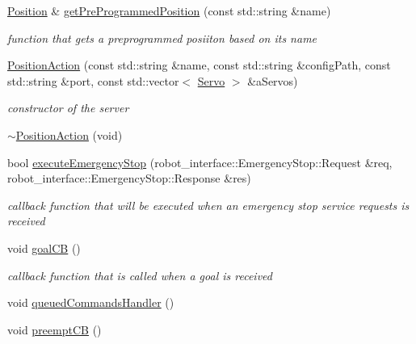 \begin{DoxyCompactItemize}
\item 
\hyperlink{structRobotInterface_1_1HighLevel_1_1Position}{Position} \& \hyperlink{classRobotInterface_1_1HighLevel_1_1PositionAction_a8a7971e098ed10e5ab8122ace60e2ae9}{get\+Pre\+Programmed\+Position} (const std\+::string \&name)
\begin{DoxyCompactList}\small\item\em function that gets a preprogrammed posiiton based on its name \end{DoxyCompactList}\item 
\hyperlink{classRobotInterface_1_1HighLevel_1_1PositionAction_a60ee7d48747b2b7e2e0c25129d2d3172}{Position\+Action} (const std\+::string \&name, const std\+::string \&config\+Path, const std\+::string \&port, const std\+::vector$<$ \hyperlink{classRobotInterface_1_1HighLevel_1_1Servo}{Servo} $>$ \&a\+Servos)
\begin{DoxyCompactList}\small\item\em constructor of the server \end{DoxyCompactList}\item 
\hyperlink{classRobotInterface_1_1HighLevel_1_1PositionAction_afffd79b5a66078902eb088f13ebd91d3}{$\sim$\+Position\+Action} (void)
\item 
bool \hyperlink{classRobotInterface_1_1HighLevel_1_1PositionAction_a2180199509879ef13320c6a4158b16d3}{execute\+Emergency\+Stop} (robot\+\_\+interface\+::\+Emergency\+Stop\+::\+Request \&req, robot\+\_\+interface\+::\+Emergency\+Stop\+::\+Response \&res)
\begin{DoxyCompactList}\small\item\em callback function that will be executed when an emergency stop service requests is received \end{DoxyCompactList}\item 
void \hyperlink{classRobotInterface_1_1HighLevel_1_1PositionAction_a0b8e2a8bba768b455d01a1cb8b86e49d}{goal\+CB} ()\hypertarget{classRobotInterface_1_1HighLevel_1_1PositionAction_a0b8e2a8bba768b455d01a1cb8b86e49d}{}\label{classRobotInterface_1_1HighLevel_1_1PositionAction_a0b8e2a8bba768b455d01a1cb8b86e49d}

\begin{DoxyCompactList}\small\item\em callback function that is called when a goal is received \end{DoxyCompactList}\item 
void \hyperlink{classRobotInterface_1_1HighLevel_1_1PositionAction_a67e2201359a279d472d3a19e6acc1056}{queued\+Commands\+Handler} ()
\item 
void \hyperlink{classRobotInterface_1_1HighLevel_1_1PositionAction_ade30b4b9c8acbec7730749274882f8d0}{preempt\+CB} ()\hypertarget{classRobotInterface_1_1HighLevel_1_1PositionAction_ade30b4b9c8acbec7730749274882f8d0}{}\label{classRobotInterface_1_1HighLevel_1_1PositionAction_ade30b4b9c8acbec7730749274882f8d0}


\end{DoxyCompactItemize}
